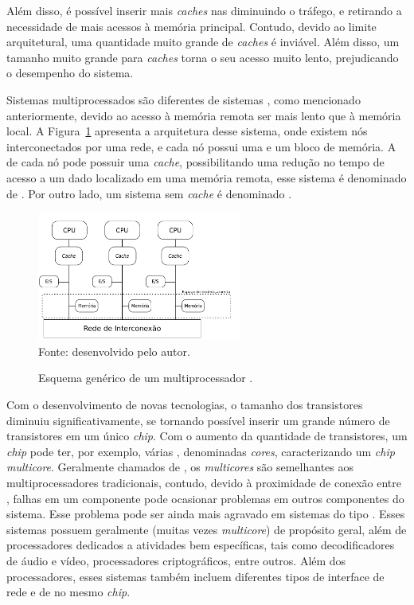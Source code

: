 Além disso, é possível inserir mais \textit{caches} nas \cpus
diminuindo o tráfego, e retirando a necessidade de mais acessos à memória
principal. Contudo, devido ao limite arquitetural, uma quantidade muito grande
de \textit{caches} é inviável. Além disso, um tamanho muito grande para
\textit{caches} torna o seu acesso muito lento, prejudicando o desempenho do
sistema.

Sistemas multiprocessados \numa são diferentes de sistemas \uma, como mencionado
anteriormente, devido ao acesso à memória remota ser mais lento que à memória
local. A Figura~\ref{fig:numa} apresenta a arquitetura desse sistema, onde
existem nós interconectados por uma rede, e cada nó possui uma \cpu e um bloco
de memória. A \cpu de cada nó pode possuir uma \textit{cache}, possibilitando
uma redução no tempo de acesso a um dado localizado em uma memória remota, esse
sistema é denominado de \ccnuma. Por outro lado, um sistema sem \textit{cache} é
denominado \ncnuma.

\begin{figure}[t]
	\centering
    \caption{Esquema genérico de um multiprocessador \numa.}
    \includegraphics[width=0.6\textwidth]{figs/multiprocNUMA.pdf} \\
    Fonte: desenvolvido pelo autor.
    \label{fig:numa}
\end{figure}

Com o desenvolvimento de novas tecnologias, o tamanho
dos transistores diminuiu significativamente, se tornando possível inserir um
grande número de transistores em um único \textit{chip}.
Com o aumento da quantidade de transistores, um \textit{chip} pode ter, por
exemplo, várias \cpus, denominadas \textit{cores}, caracterizando um
\textit{chip} \textit{multicore}.
Geralmente chamados de \cmps, os \textit{multicores} são semelhantes aos multiprocessadores
tradicionais, contudo, devido à proximidade de conexão entre \cpus, falhas em um
componente pode ocasionar problemas em outros componentes do sistema.
Esse problema pode ser ainda mais agravado em sistemas do tipo \mpsoc. Esses sistemas
possuem geralmente \cpus (muitas vezes \textit{multicore}) de propósito geral, além de processadores
dedicados a atividades bem específicas, tais como decodificadores de áudio e vídeo, processadores
criptográficos, entre outros. Além dos processadores, esses sistemas também incluem diferentes tipos
de interface de rede e de \es no mesmo \textit{chip}.


